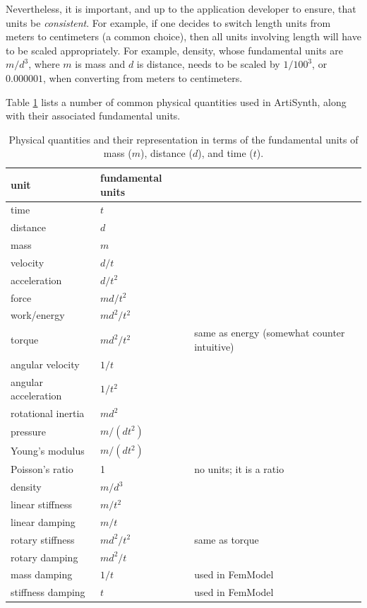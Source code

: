 Nevertheless, it is important, and up to the application developer to
ensure, that units be {\it consistent}. For example, if one decides to
switch length units from meters to centimeters (a common choice),
then all units involving length will have to be scaled appropriately.
For example, density, whose fundamental units are $m/d^3$, where $m$ is mass and
$d$ is distance, needs to be scaled by $1/100^3$, or $0.000001$, when
converting from meters to centimeters.

Table \ref{Units:tab} lists a number of common physical quantities
used in ArtiSynth, along with their associated fundamental units.

\begin{table}
\begin{center}
\begin{tabular}{|lll|}
\hline
unit & fundamental units & \\
\hline
time                    & $t$ & \\
distance                & $d$ & \\
mass                    & $m$ & \\
velocity                & $d/t$ & \\
acceleration            & $d/t^2$ & \\
force                   & $m d/t^2$ & \\
work/energy             & $m d^2/t^2$& \\
torque                  & $m d^2/t^2$ & same as energy (somewhat counter intuitive)\\
angular velocity        & $1/t$ & \\
angular acceleration    & $1/t^2$ & \\
rotational inertia      & $m d^2$ & \\
pressure                & $m/(d t^2)$ & \\
Young's modulus         & $m/(d t^2)$ & \\
Poisson's ratio         & 1 & no units; it is a ratio \\
density                 & $m/d^3$ & \\
linear stiffness        & $m/t^2$ & \\
linear damping          & $m/t$ & \\
rotary stiffness        & $m d^2/t^2$ & same as torque \\
rotary damping          & $m d^2/t$ & \\
mass damping            & $1/t$ & used in FemModel \\
stiffness damping       & $t$ & used in FemModel \\
\hline
\end{tabular}
\end{center}
\caption{Physical quantities and their representation in terms of the
fundamental units of mass ($m$), distance ($d$), and time ($t$).}
\label{Units:tab}
\end{table}

